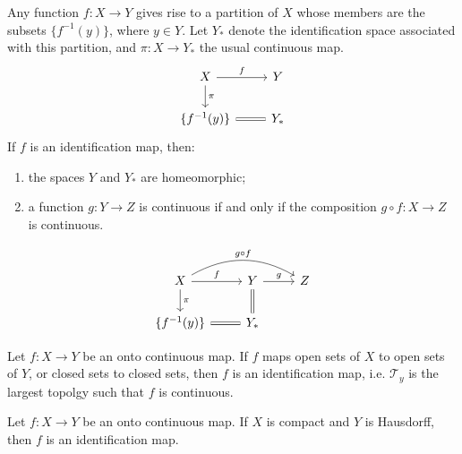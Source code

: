 \begin{thm}
    Any function $f:X\to Y$ gives rise to a partition of $X$ whose
    members are the subsets $\{f^{-1}(y)\}$, where $y\in Y$. Let $Y_*$
    denote the identification space associated with this partition,
    and $\pi:X\to Y_*$ the usual continuous map. 
    $$ \begin{tikzcd}[]
        X\ar[r,"f"]\ar[d,"\pi"] & Y \\
        \{f^{-1}(y)\} \ar[r,equal] & Y_*
    \end{tikzcd} $$
    If $f$ is an identification map, then:
    \begin{enumerate}
        \item the spaces $Y$ and $Y_*$ are homeomorphic;
        \item a function $g:Y\to Z$ is continuous if and only if the
            composition $g\circ f:X\to Z$ is continuous.
    \end{enumerate}
    $$ \begin{tikzcd}[]
        X\ar[r,"f"]\ar[d,"\pi"]\ar[rr,"g\circ f",bend left] 
            & Y\ar[d,equal,"~"]\ar[r,"g"] & Z \\
        \{f^{-1}(y)\} \ar[r,equal] & Y_*
    \end{tikzcd} $$
\end{thm}
\begin{thm}
    Let $f:X\to Y$ be an onto continuous map. If $f$ maps open sets of
    $X$ to open sets of $Y$, or closed sets to closed sets, then $f$
    is an identification map, i.e. $\mathcal{T}_y$ is the largest
    topolgy such that $f$ is continuous.
\end{thm}
\begin{coro}
    \label{coro:idmap-coro}
    Let $f:X\to Y$ be an onto continuous map. If $X$ is compact and
    $Y$ is Hausdorff, then $f$ is an identification map.
\end{coro}

